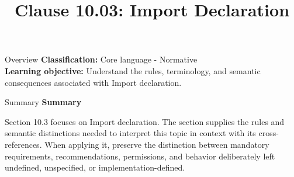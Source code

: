 \documentclass[10pt,letterpaper]{article}
\title{Clause 10.03: Import Declaration}
\author{}
\date{}
\begin{document}
\maketitle
\begin{CornellOverviewBox}{Overview}
\textbf{Classification:} Core language - Normative\\[2pt]
\textbf{Learning objective:} Understand the rules, terminology, and semantic consequences associated with Import declaration.
\end{CornellOverviewBox}\begin{CornellSummaryBox}{Summary}
{\sffamily\bfseries\color{Accent} Summary}\par\vspace{3pt}Section 10.3 focuses on Import declaration. The section supplies the rules and semantic distinctions needed to interpret this topic in context with its cross-references. When applying it, preserve the distinction between mandatory requirements, recommendations, permissions, and behavior deliberately left undefined, unspecified, or implementation-defined.
\end{CornellSummaryBox}
\end{document}
